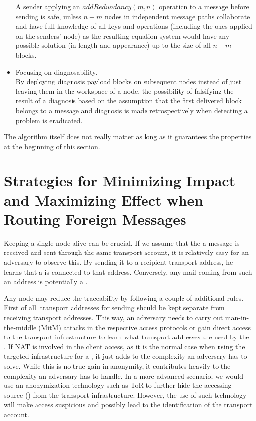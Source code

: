 \begin{itemize}
	A sender applying an $addRedundancy(m,n)$ operation to a message before sending is safe, unless $n-m$ nodes in independent message paths collaborate and have full knowledge of all keys and operations (including the ones applied on the senders' node) as the resulting equation system would have any possible solution (in length and appearance) up to the size of all $n-m$ blocks.
	\item Focusing on diagnosability.\\
	By deploying diagnosis payload blocks on subsequent nodes instead of just leaving them in the workspace of a node, the possibility of falsifying the result of a diagnosis based on the assumption that the first delivered block belongs to a message and diagnosis is made retrospectively when detecting a problem is eradicated. 
\end{itemize}

The algorithm itself does not really matter as long as it guarantees the properties at the beginning of this section.

\section{Strategies for Minimizing Impact and Maximizing Effect when Routing Foreign Messages}
Keeping a single node alive can be crucial. If we assume that the a message is received and sent through the same transport account, it is relatively easy for an adversary to observe this. By sending it to a recipient transport address, he learns that a \VortexNode{} is connected to that address. Conversely, any mail coming from such an address is potentially a \VortexMessage{}.

Any node may reduce the traceability by following a couple of additional rules. First of all, transport addresses for sending should be kept separate from receiving transport addresses. This way, an adversary needs to carry out man-in-the-middle (MitM) attacks in the respective access protocols or gain direct access to the transport infrastructure to learn what transport addresses are used by the \VortexNode{}. If NAT is involved in the client access, as it is the normal case when using the targeted infrastructure for a \VortexNode, it just adds to the complexity an adversary has to solve. While this is no true gain in anonymity, it contributes heavily to the complexity an adversary has to handle. In a more advanced scenario, we would use an anonymization technology such as ToR to further hide the accessing source (\VortexNode) from the transport infrastructure. However, the use of such technology will make access suspicious and possibly lead to the identification of the transport account.

